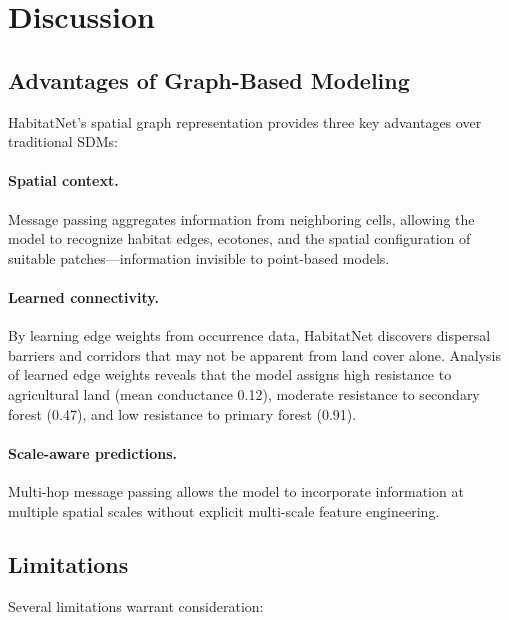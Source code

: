 \section{Discussion}

\label{sec:discussion}

\subsection{Advantages of Graph-Based Modeling}

HabitatNet's spatial graph representation provides three key advantages
over traditional SDMs:

\paragraph{Spatial context.} Message passing aggregates information from
neighboring cells, allowing the model to recognize habitat edges,
ecotones, and the spatial configuration of suitable patches---information
invisible to point-based models.

\paragraph{Learned connectivity.} By learning edge weights from
occurrence data, HabitatNet discovers dispersal barriers and corridors
that may not be apparent from land cover alone. Analysis of learned edge
weights reveals that the model assigns high resistance to agricultural
land (mean conductance 0.12), moderate resistance to secondary forest
(0.47), and low resistance to primary forest (0.91).

\paragraph{Scale-aware predictions.} Multi-hop message passing allows
the model to incorporate information at multiple spatial scales without
explicit multi-scale feature engineering.

\subsection{Limitations}

Several limitations warrant consideration:

